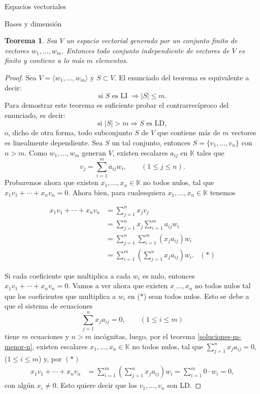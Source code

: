 \documentclass[a4paper,12pt,twoside,spanish,reqno]{amsbook}
\numberwithin{equation}{section}
\newtheorem{teorema}{Teorema}[section]
\theoremstyle{definition}
\theoremstyle{remark}
\newcommand{\la}{\langle}
\newcommand{\ra}{\rangle}
\newcommand{\K}{\mathbb K}
\begin{document}
\begin{chapter}{Espacios vectoriales}
\begin{section}{Bases y dimensión}
\begin{teorema}\label{indep-menorigual-gen}
    Sea $V$ un espacio vectorial generado por un conjunto finito de vectores $w_1,\ldots,w_m$. Entonces todo conjunto independiente de vectores de $V$ es finito y  contiene a lo más $m$ elementos. 
\end{teorema}
\begin{proof} Sea $V = \la w_1,\ldots,w_m\ra$ y  $S \subset V$.   El  enunciado del teorema es equivalente a decir:
    $$
    \text{si }S \text{ es LI } \Rightarrow |S| \le m.
    $$
    Para demostrar este teorema es suficiente probar el contrarrecíproco del enunciado, es decir:
    $$
    \text{si }|S| > m \Rightarrow S \text{ es LD},
    $$
    o, dicho  de otra forma, todo subconjunto $S$ de $V$ que contiene más de $m$ vectores es linealmente dependiente. Sea $S$ un tal conjunto,  entonces $S = \{v_1,\ldots,v_n\}$ con $n >m$.  Como  $w_1,\ldots,w_m$ generan $V$, existen escalares $a_{ij}$ en $\K$ tales que
    \begin{equation*}
        v_j = \sum_{i=1}^{m}a_{ij}w_i, \qquad (1 \le j \le n).
    \end{equation*}
    Probaremos ahora que existen $x_1,\ldots,x_n \in \K$ no todos nulos, tal que $x_1v_1 + \cdots+x_nv_n =0$. Ahora bien, para cualesquiera $x_1,\ldots,x_n \in \K$ tenemos


    \begin{align*}
        x_1v_1 + \cdots+x_nv_n &= \sum_{j=1}^{n} x_jv_j& \\
        & = \sum_{j=1}^{n}x_j \sum_{i=1}^{m}a_{ij}w_i& \\
        & = \sum_{j=1}^{n} \sum_{i=1}^{m}(x_ja_{ij})w_i& \\ 
        & = \sum_{i=1}^{m}(\sum_{j=1}^{n} x_ja_{ij})w_i.&  (*)
    \end{align*}
    
    Si cada coeficiente que multiplica a cada $w_i$ es nulo, entonces $  x_1v_1 + \cdots+x_nv_n=0$. Vamos a ver ahora que existen $x_,\ldots,x_n$ no todos nulos tal que los coeficientes que multiplica a $w_i$  en ($*$) sean todos nulos. Esto se debe a que el sistema de ecuaciones
    \begin{equation*}
        \sum_{j=1}^{n} x_ja_{ij} = 0, \qquad (1 \le i \le m) 
    \end{equation*}
    tiene $m$ ecuaciones  y $n > m$ incógnitas, luego, por el teorema \ref{soluciones-m-menor-n}, existen escalares $x_1,\ldots,x_n \in \K$ no todos nulos, tal que $\sum_{j=1}^{n} x_ja_{ij} = 0$, ($1 \le i \le m$) y, por $(*)$
    \begin{align*}
        x_1v_1 + \cdots+x_nv_n &=  \sum_{i=1}^{m}(\sum_{j=1}^{n} x_ja_{ij})w_i = \sum_{i=1}^{m}0\cdot w_i =0,
    \end{align*}
    con algún $x_i \ne 0$. Esto quiere decir que los $v_1,\ldots,v_n$ son LD.
\end{proof}



\end{section}
\end{chapter}
\end{document}
